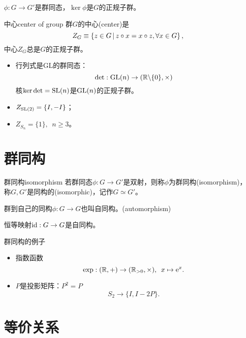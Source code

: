 \begin{theorem}{}{}
	$\phi:G\to G'$是群同态，$\ker\phi$是$G$的正规子群。
\end{theorem}
\begin{definition}{中心}{center of group}
	群$G$的中心(center)是
	\begin{equation}
		Z_G\equiv\left\{z\in G\,\middle\vert\,z\circ x=x\circ z,\forall x\in G\right\},
	\end{equation}
	中心$Z_G$总是$G$的正规子群。
\end{definition}
\begin{example}{}{}
	\begin{itemize}
		\item 行列式是GL的群同态：
		\[
			\det:\operatorname{GL}(n)\to(\mathbb R\backslash\{0\},\times)
		\]
		核$\ker\det=\operatorname{SL}(n)$是$\operatorname{GL}(n)$的正规子群。
		\item $Z_{\operatorname{SL}(2)}=\{I,-I\}$；
		\item $Z_{S_n}=\{1\},\enspace n\geq 3$。
	\end{itemize}
\end{example}

\section{群同构}

\begin{definition}{群同构}{isomorphism}
	若群同态$\phi:G\to G'$是双射，则称$\phi$为群同构(isomorphism)，称$G,G'$是同构的(isomorphic)，记作$G\simeq G'$。
	
	群到自己的同构$\phi:G\to G$也叫自同构。(automorphism)
\end{definition}
恒等映射$\operatorname{id}:G\to G$是自同构。
\begin{example}{群同构的例子}{}
	\begin{itemize}
		\item 指数函数
		\[
			\exp:(\mathbb R,+)\to(\mathbb R_{>0},\times),\enspace x\mapsto\mathop{}\!\mathrm{e}^ x.
		\]
		\item $P$是投影矩阵：$P^2=P$
		\[
			S_2\to\{I,I-2P\}.
		\]
	\end{itemize}
\end{example}

\section{等价关系}


